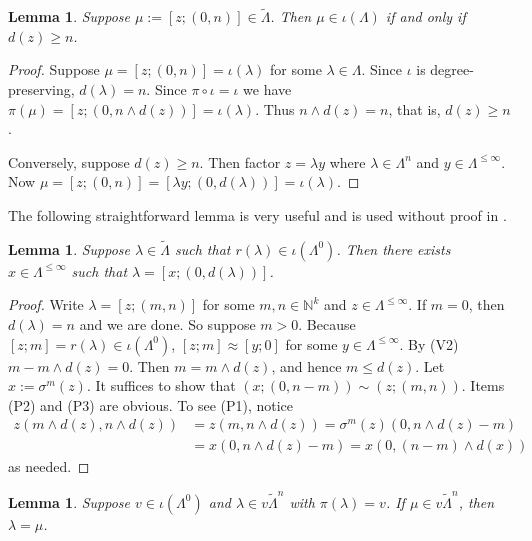 \documentclass[a4paper,12pt]{amsart}
\numberwithin{equation}{section}
\newtheorem{lemma}[thm]{Lemma}
\theoremstyle{definition}
\theoremstyle{remark}
\begin{document}
\begin{lemma}\label{lem:extending_bd_paths}
 Suppose $\mu := [z; (0,n)] \in {\tilde{\Lambda}}$.  Then $\mu \in \iota(\Lambda)$ if and only if 
$d(z) \geq n$.
\end{lemma}

\begin{proof}
Suppose $\mu = [z;(0,n)] = \iota(\lambda)$ for some $\lambda \in \Lambda$.  Since $\iota$ is degree-preserving, $d(\lambda) = n$. Since $\pi\circ \iota=\iota$ we have $\pi(\mu)=[z;(0,n\wedge d(z))]=\iota(\lambda)$. Thus $n\wedge d(z)=n$, that is, $d(z)\geq n$.

Conversely, suppose $d(z)\geq n$. Then factor $z=\lambda y$ where $\lambda\in\Lambda^n$ and $y\in\Lambda^{\leq\infty}$. Now $\mu=[z;(0,n)]=[\lambda y;(0,d(\lambda))]=\iota(\lambda)$. 
\end{proof}

The following straightforward lemma is very 
useful and  is used without proof in \cite{W}.
\begin{lemma}
\label{lem:0dlambda}
Suppose $\lambda \in {\tilde{\Lambda}}$ such that
 $r(\lambda) \in \iota(\Lambda^0)$.  Then there exists 
$x \in \Lambda^{\leq \infty}$ such that 
$\lambda = [x;(0,d(\lambda))]$.
\end{lemma}
 \begin{proof}
  Write $\lambda = [z;(m,n)]$ for some $m,n \in {\mathbb{N}}^k$ and $z\in \Lambda^{\leq \infty}$.
If $m=0$, then $d(\lambda)=n$ and we are done.  So suppose $m > 0$.  Because
 $[z;m]=r(\lambda) \in \iota(\Lambda^0)$,
$[z;m] \approx [y;0]$ for some $y \in \Lambda^{\leq \infty}$.  By (V2) $m-m \wedge d(z) = 0$. 
Then $m = m \wedge d(z)$, and hence $m \leq d(z)$.  Let $x:=\sigma^m(z)$. 
It suffices to show that $(x;(0,n-m)) \sim (z;(m,n))$.  
Items (P2) and (P3) are obvious.  To see (P1), notice
\begin{align*}
 z(m \wedge d(z),n \wedge d(z)) &= z(m,n \wedge d(z))= \sigma^m(z)(0, n \wedge d(z)-m)\\
&= x(0, n \wedge d(z)-m)= x(0, (n-m) \wedge d(x))
\end{align*}
as needed.
 \end{proof}

\begin{lemma}\label{lem:Claire_13_14}
Suppose $v \in \iota(\Lambda^0)$ and  $\lambda \in v \tilde{\Lambda}^n$ with
$\pi(\lambda) = v$.  If 
$\mu \in v\tilde{\Lambda}^{n}$,
then $\lambda=\mu$. 
\end{lemma}
\end{document}
